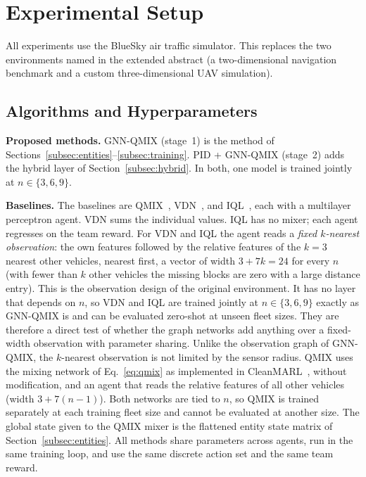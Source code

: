 \section{Experimental Setup}
\label{sec:setup}
All experiments use the BlueSky air traffic simulator. This replaces the two environments
named in the extended abstract (a two-dimensional navigation benchmark and a custom
three-dimensional UAV simulation).



\subsection{Algorithms and Hyperparameters}
\label{subsec:algorithms}
\textbf{Proposed methods.} GNN-QMIX (stage~1) is the method of
Sections~\ref{subsec:entities}--\ref{subsec:training}. PID + GNN-QMIX (stage~2) adds the
hybrid layer of Section~\ref{subsec:hybrid}. In both, one model is trained jointly at
$n\in\{3,6,9\}$.

\textbf{Baselines.} The baselines are QMIX~\cite{qmix}, VDN~\cite{vdn}, and IQL~\cite{iql},
each with a multilayer perceptron agent. VDN sums the individual values. IQL has no mixer;
each agent regresses on the team reward. For VDN and IQL the agent reads a \emph{fixed
$k$-nearest observation}: the own features followed by the relative features of the $k=3$
nearest other vehicles, nearest first, a vector of width $3+7k=24$ for every $n$ (with fewer
than $k$ other vehicles the missing blocks are zero with a large distance entry). This is the
observation design of the original environment. It has no layer that depends on $n$, so VDN
and IQL are trained jointly at $n\in\{3,6,9\}$ exactly as GNN-QMIX is and can be evaluated
zero-shot at unseen fleet sizes. They are therefore a direct test of whether the graph
networks add anything over a fixed-width observation with parameter sharing. Unlike the
observation graph of GNN-QMIX, the $k$-nearest observation is not limited by the sensor
radius. QMIX uses the mixing network of Eq.~\eqref{eq:qmix} as implemented in
CleanMARL~\cite{cleanmarl}, without modification, and an agent that reads the relative
features of all other vehicles (width $3+7(n-1)$). Both networks are tied to $n$, so QMIX is
trained separately at each training fleet size and cannot be evaluated at another size. The
global state given to the QMIX mixer is the flattened entity state matrix of
Section~\ref{subsec:entities}. All methods share parameters across agents, run in the same
training loop, and use the same discrete action set and the same team reward.

